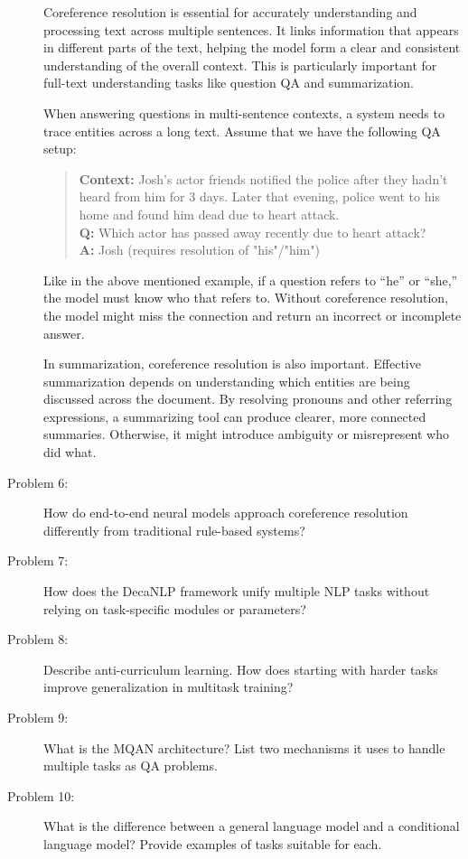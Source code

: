 \documentclass[10pt]{article}
\begin{document}
\begin{description}
Coreference resolution is essential for accurately understanding and processing text across multiple sentences. 
It links information that appears in different parts of the text, helping the model form a clear and consistent understanding of the overall context.
This is particularly important for full-text understanding tasks like question QA and summarization.

When answering questions in multi-sentence contexts, a system needs to trace entities across a long text.
Assume that we have the following QA setup:

\begin{quote}
    \textbf{Context:} Josh's actor friends notified the police after they hadn't heard from him for 3 days.
    Later that evening, police went to his home and found him dead due to heart attack. \\
    \textbf{Q:} Which actor has passed away recently due to heart attack? \\
    \textbf{A:} Josh (requires resolution of "his"/"him") \\
\end{quote}

Like in the above mentioned example, if a question refers to “he” or “she,” the model must know who that refers to. 
Without coreference resolution, the model might miss the connection and return an incorrect or incomplete answer.

In summarization, coreference resolution is also important. 
Effective summarization depends on understanding which entities are being discussed across the document. 
By resolving pronouns and other referring expressions, a summarizing tool can produce clearer, more connected summaries. 
Otherwise, it might introduce ambiguity or misrepresent who did what.

\pagebreak

\item[Problem 6:] How do end-to-end neural models approach coreference resolution differently from traditional rule-based systems?

\pagebreak

\item[Problem 7:] How does the DecaNLP framework unify multiple NLP tasks without relying on task-specific modules or parameters?

\pagebreak

\item[Problem 8:] Describe anti-curriculum learning. How does starting with harder tasks improve generalization in multitask training?

\pagebreak

\item[Problem 9:] What is the MQAN architecture? List two mechanisms it uses to handle multiple tasks as QA problems.

\pagebreak

\item[Problem 10:] What is the difference between a general language model and a conditional language model? Provide examples of tasks suitable for each.

\end{description}
\end{document}
